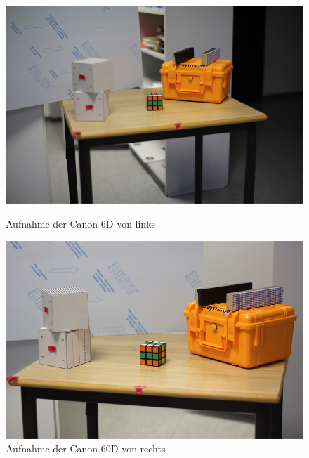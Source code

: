 \begin{figure}[!htb]
	\includegraphics[width=\linewidth]{images/Points3DSceneLeft.png}
	\caption{Aufnahme der Canon 6D von links}
	\label{fig:awesome_image1}
	\endminipage\hfill
	\includegraphics[width=\linewidth]{images/Points3DSceneRight.png}
	\caption{Aufnahme der Canon 60D von rechts}
	\label{fig:awesome_image2}
	\endminipage\hfill
\end{figure}

